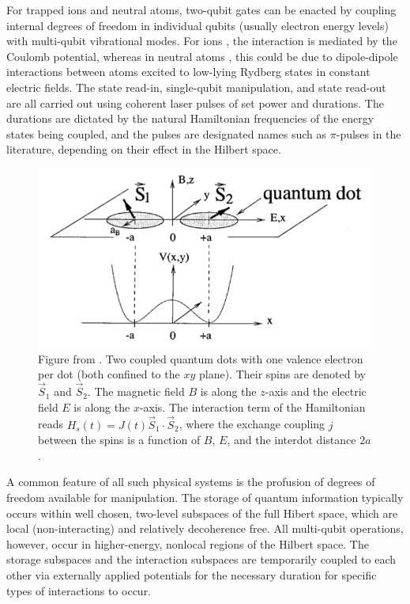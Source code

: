 \documentclass[twocolumn]{Styles/IEEEtran11}
\begin{document}
For trapped ions and neutral atoms, two-qubit gates can be enacted by coupling internal degrees of freedom in individual qubits (usually electron energy levels) with multi-qubit vibrational modes. For ions \cite{zoller1995}, the interaction is mediated by the Coulomb potential, whereas in neutral atoms \cite{lukin2000}, this could be due to dipole-dipole interactions between atoms excited to low-lying Rydberg states in constant electric fields. The state read-in, single-qubit manipulation, and state read-out are all carried out using coherent laser pulses of set power and durations. The durations are dictated by the natural Hamiltonian frequencies of the energy states being coupled, and the pulses are designated names such as $\pi$-pulses in the literature, depending on their effect in the Hilbert space.

\begin{figure}[hbt]
  \centering
  \includegraphics[width=\linewidth]{Images/qdot.png}
  \caption{Figure from \protect\cite{divincenzo1999}. Two coupled quantum dots with one valence electron per dot (both confined to the $xy$ plane). Their spins are denoted by $\vec{S}_1$ and $\vec{S}_2$. The magnetic field $B$ is along the $z$-axis and the electric field $E$ is along the $x$-axis. The interaction term of the Hamiltonian reads $H_s(t) = J(t)\vec{S}_1\cdot\vec{S}_2$, where the exchange coupling $j$ between the spins is a function of $B$, $E$, and the interdot distance $2a$.}
  \label{qdotfig}
\end{figure}

A common feature of all such physical systems is the profusion of degrees of freedom available for manipulation. The storage of quantum information typically occurs within well chosen, two-level subspaces of the full Hibert space, which are local (non-interacting) and relatively decoherence free. All multi-qubit operations, however, occur in higher-energy, nonlocal regions of the Hilbert space. The storage subspaces and the interaction subspaces are temporarily coupled to each other via externally applied potentials for the necessary duration for specific types of interactions to occur.
\end{document}
